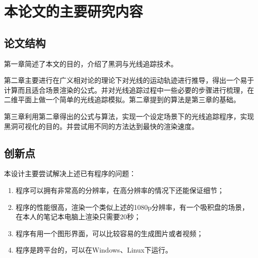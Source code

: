 \section{本论文的主要研究内容}
\subsection{论文结构}
第一章简述了本文的目的，介绍了黑洞与光线追踪技术。

第二章主要进行在广义相对论的理论下对光线的运动轨迹进行推导，得出一个易于计算而且适合场景渲染的公式。并对光线追踪过程中一些必要的步骤进行梳理，在二维平面上做一个简单的光线追踪模拟。第二章提到的算法是第三章的基础。

第三章利用第二章得出的公式与算法，实现一个设定场景下的光线追踪程序，实现黑洞可视化的目的。并尝试用不同的方法达到最快的渲染速度。
\subsection{创新点}
本设计主要尝试解决上述已有程序的问题：
\begin{enumerate}
    \item 程序可以拥有非常高的分辨率，在高分辨率的情况下还能保证细节；
    \item 程序的性能很高，渲染一个类似上述的1080p分辨率，有一个吸积盘的场景，在本人的笔记本电脑上渲染只需要20秒；
    \item 程序有用一个图形界面，可以比较容易的生成图片或者视频；
    \item 程序是跨平台的，可以在Windows、Linux下运行。
\end{enumerate}


